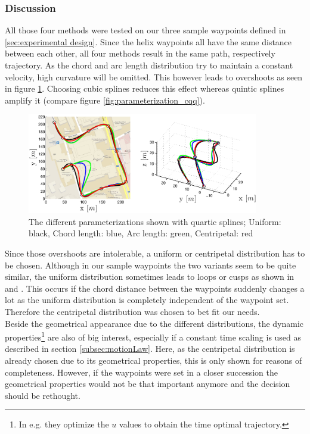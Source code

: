 \subsubsection{Discussion}


All those four methods were tested on our three sample waypoints defined in \ref{sec:experimental design}. Since the helix waypoints all have the same distance between each other, all four methods result in the same path, respectively trajectory. As the chord and arc length distribution try to maintain a constant velocity, high curvature will be omitted. This however leads to overshoots as seen in figure \ref{fig:parameterizations4_road_agile}. Choosing cubic splines reduces this effect whereas quintic splines amplify it (compare figure \ref{fig:parameterization_cqq}).

\begin{figure}[H]
	\centering
    \includegraphics[width = 0.9\textwidth]{graphics/Parameterizations4_road_agile.eps}
  \caption{The different parameterizations shown with quartic splines; Uniform: black, Chord length: blue, Arc length: green, Centripetal: red}
  \label{fig:parameterizations4_road_agile}
\end{figure}

Since those overshoots are intolerable, a uniform or centripetal distribution has to be chosen. Although in our sample waypoints the two variants seem to be quite similar, the uniform distribution sometimes leads to  loops or cusps as shown in \cite{lee} and \cite{haron}. This occurs if the chord distance between the waypoints suddenly changes a lot as the uniform distribution is completely independent of the waypoint set. Therefore the centripetal distribution was chosen to bet fit our needs.
\\
Beside the geometrical appearance due to the different distributions, the dynamic properties\footnote{In \cite{mellinger} e.g. they optimize the $u$ values to obtain the time optimal trajectory.} are also of big interest, especially if a constant time scaling is used as described in section \ref{subsec:motionLaw}. Here, as the centripetal distribution is already chosen due to its geometrical properties, this is only shown for reasons of completeness. However, if the waypoints were set in a closer succession the geometrical properties would not be that important anymore and the decision should be rethought.

